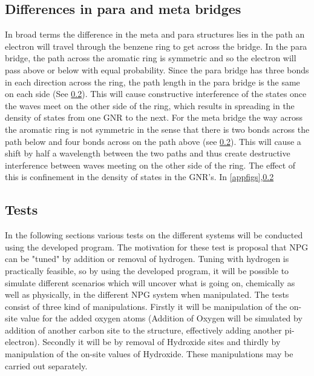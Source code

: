 \subsection{Differences in para and meta bridges}
In broad terms the difference in the meta and para structures lies in the path an electron will travel through the benzene ring to get across the bridge. In the para bridge, the path across the aromatic ring is symmetric and so the electron will pass above or below with equal probability. Since the para bridge has three bonds in each direction across the ring, the path length in the para bridge is the same on each side (See \cref{}). This will cause constructive interference of the states once the waves meet on the other side of the ring, which results in spreading in the density of states from one GNR to the next. For the meta bridge the way across the aromatic ring is not symmetric in the sense that there is two bonds across the path below and four bonds across on the path above (see \cref{}). This will cause a shift by half a wavelength between the two paths and thus create destructive interference between waves meeting on the other side of the ring. The effect of this is confinement in the density of states in the GNR's. In \cref{appfigs},\cref{} 
\subsection{Tests}
In the following sections various tests on the different systems will be conducted using the developed program. The motivation for these test is proposal that NPG can be "tuned" by addition or removal of hydrogen. Tuning with hydrogen is practically feasible, so by using the developed program, it will be possible to simulate different scenarios which will uncover what is going on, chemically as well as physically, in the different NPG system when manipulated. The tests consist of three kind of manipulations. Firstly it will be manipulation of the on-site value for the added oxygen atoms (Addition of Oxygen will be simulated by addition of another carbon site to the structure, effectively adding another pi-electron). Secondly it will be by removal of Hydroxide sites and thirdly by manipulation of the on-site values of Hydroxide. These manipulations may be carried out separately. \\
